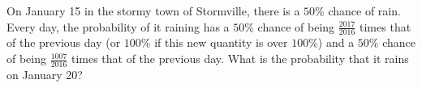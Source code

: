 On January 15 in the stormy town of Stormville, there is a $50\%$ chance of rain. Every day, the probability of it raining has a $50\%$ chance of being $\frac{2017}{2016}$ times that of the previous day (or $100\%$ if this new quantity is over $100\%$) and a $50\%$ chance of being $\frac{1007}{2016}$ times that of the previous day. What is the probability that it rains on January 20?